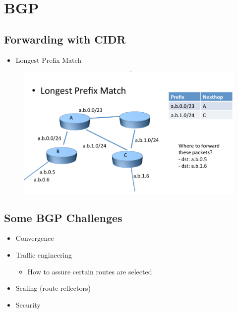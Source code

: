 \section{BGP}
\subsection{Forwarding with CIDR}
\begin{itemize}[nosep]
    \item Longest Prefix Match
\end{itemize}
\begin{figure}[H]
    \includegraphics[width=\textwidth]{lazy/longestprefix.png}
\end{figure}

\subsection{Some BGP Challenges}
\begin{itemize}[nosep]
    \item Convergence
    \item Traffic engineering
          \begin{itemize}[nosep]
              \item How to assure certain routes are selected
          \end{itemize}
    \item Scaling (route reflectors)
    \item Security
\end{itemize}

